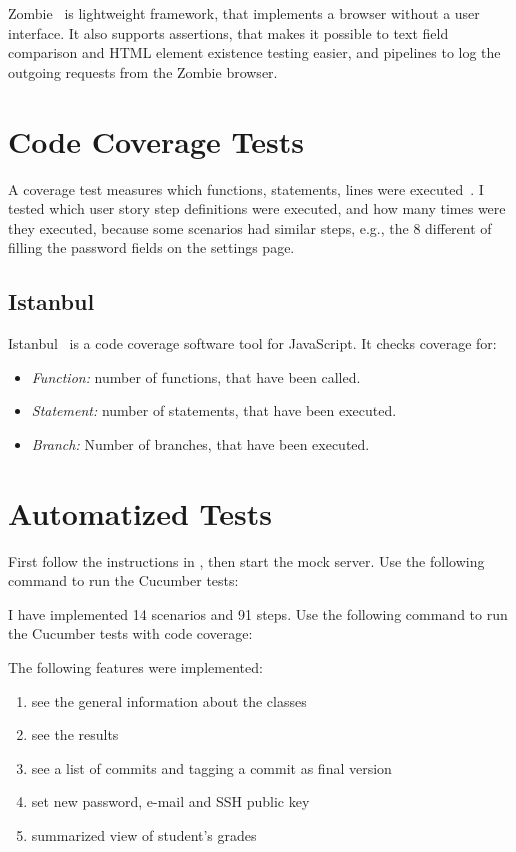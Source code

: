 Zombie~\cite{zombie} is lightweight framework, that implements a browser without a user interface. It also supports assertions, that makes it possible to text field comparison and HTML element existence testing easier, and pipelines to log the outgoing requests from the Zombie browser. 

\section{Code Coverage Tests}
A coverage test measures which functions, statements, lines were executed~\cite{szofttech}. I tested which user story step definitions were executed, and how many times were they executed, because some scenarios had similar steps, e.g., the 8 different of filling the password fields on the settings page.

\subsection{Istanbul}
Istanbul~\cite{istanbul} is a code coverage software tool for JavaScript. It checks coverage for:

\begin{itemize}
	\item \emph{Function:} number of functions, that have been called.
	\item \emph{Statement:} number of statements, that have been executed.
	\item \emph{Branch:} Number of branches, that have been executed.
\end{itemize}

\section{Automatized Tests}
First follow the instructions in , then start the mock server. Use the following command to run the Cucumber tests:


I have implemented 14 scenarios and 91 steps. Use the following command to run the Cucumber tests with code coverage:


The following features were implemented:

\begin{enumerate}
	\item see the general information about the classes
	\setcounter{enumi}{0}
	\item see the results
	\item see a list of commits and tagging a commit as final version
	\setcounter{enumi}{1}
	\item set new password, e-mail and SSH public key
	\item summarized view of student's grades
\end{enumerate}

